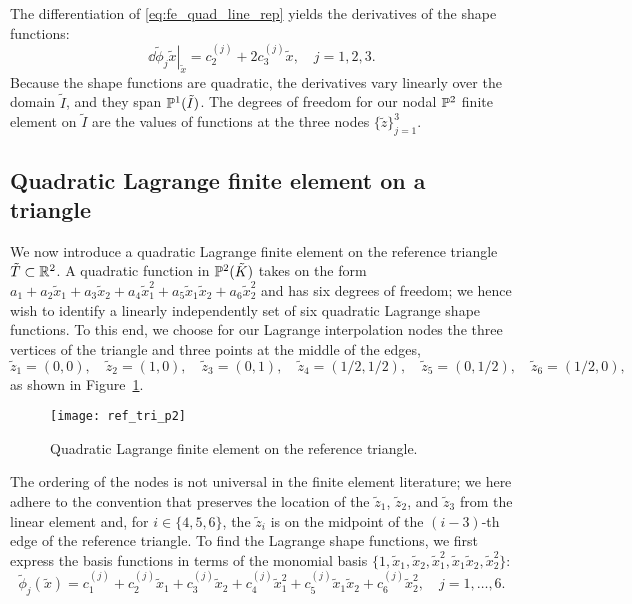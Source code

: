 The differentiation of \ref{eq:fe_quad_line_rep} yields the derivatives of the shape functions:
\begin{equation*}
  \left. \dd{\tilde \phi_j}{\tilde x} \right|_{\tilde x} = c_2^{(j)} + 2 c_3^{(j)} \tilde x , \quad j = 1,2,3.
\end{equation*}
Because the shape functions are quadratic, the derivatives vary linearly over the domain $\tilde I$, and they span $\mathbb{P}^1(\tilde I)$.  The degrees of freedom for our nodal $\mathbb{P}^2$ finite element on $\tilde I$ are the values of functions at the three nodes $\{\tilde z\}_{j=1}^3$.

\subsection{Quadratic Lagrange finite element on a triangle}
\label{sec:fe_p2_tri}
We now introduce a quadratic Lagrange finite element on the reference triangle $\tilde T \subset \mathbb{R}^2$. A quadratic function in $\mathbb{P}^2(\tilde K)$ takes on the form $a_1 + a_2 \tilde x_1 + a_3 \tilde x_2 + a_4 \tilde x_1^2 + a_5 \tilde x_1 \tilde x_2 + a_6 \tilde x_2^2$ and has six degrees of freedom; we hence wish to identify a linearly independently set of six quadratic Lagrange shape functions.  To this end, we choose for our Lagrange interpolation nodes the three vertices of the triangle and three points at the middle of the edges,
\begin{equation*}
  \tilde z_1 = (0,0), \quad \tilde z_2 = (1,0), \quad \tilde z_3 = (0,1), \quad \tilde z_4 = (1/2,1/2), \quad \tilde z_5 = (0,1/2), \quad \tilde z_6 = (1/2,0),
\end{equation*}
as shown in Figure~\ref{fig:fe_ref_tri_p2}.
\begin{figure}
  \centering
  \texttt{[image: ref\_tri\_p2]}
  \caption{Quadratic Lagrange finite element on the reference triangle.}
  \label{fig:fe_ref_tri_p2}
\end{figure}
The ordering of the nodes is not universal in the finite element literature; we here adhere to the convention that preserves the location of the $\tilde z_1$, $\tilde z_2$, and $\tilde z_3$ from the linear element and, for $i \in \{4,5,6\}$, the $\tilde z_i$ is on the midpoint of the $(i-3)$-th edge of the reference triangle. To find the Lagrange shape functions, we first express the basis functions in terms of the monomial basis $\{1,\tilde x_1, \tilde x_2, \tilde x_1^2 , \tilde x_1 \tilde x_2, \tilde x_2^2\}$:
\begin{equation}
  \tilde \phi_j(\tilde x) = c_1^{(j)} + c_2^{(j)} \tilde x_1 + c_3^{(j)} \tilde x_2 + c_4^{(j)} \tilde x_1^2 + c_5^{(j)} \tilde x_1 \tilde x_2 + c_6^{(j)} \tilde x_2^2, \quad j = 1,\dots,6.
  \label{eq:fe_quad_tri_rep}
\end{equation}
